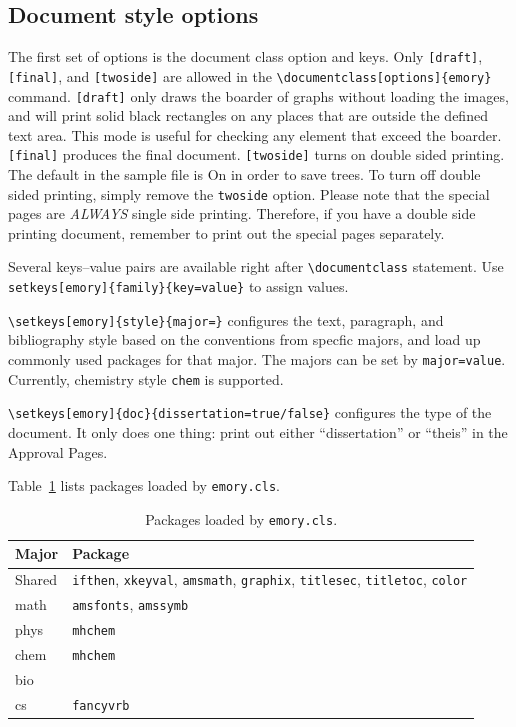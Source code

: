 \documentclass[draft]{emory}
\begin{document}
\subsection{Document style options}
The first set of options is the document class option and keys. Only \Verb|[draft]|,
\Verb|[final]|, and \Verb|[twoside]| are allowed in the \Verb|\documentclass[options]{emory}| 
command. \Verb|[draft]| only draws the boarder of graphs without loading the images,
and will print solid black rectangles on any places that are outside the defined
text area. This mode is useful for checking any element that exceed the boarder.
\Verb|[final]| produces the final document. \Verb|[twoside]| turns on double sided
printing. The default in the sample file is On in order to save trees. To turn
off double sided printing, simply remove the \Verb|twoside| option.
Please note that the special pages are \emph{ALWAYS} single side printing. 
Therefore, if you have a double side printing document, remember to print out
the special pages separately.

Several keys--value pairs are available right after \Verb|\documentclass| statement.
Use \Verb|setkeys[emory]{family}{key=value}| to assign values.

\Verb|\setkeys[emory]{style}{major=}| configures the text, paragraph, and 
bibliography style based on the conventions
from specfic majors, and load up commonly used packages for that major.
The majors can be set by \Verb|major=value|.
Currently, chemistry style \Verb|chem| is supported. 

\Verb|\setkeys[emory]{doc}{dissertation=true/false}| configures the type of the 
document. It only does one thing: print out either ``dissertation'' or ``theis''
in the Approval Pages.

Table~\ref{tbl:packages} lists packages loaded by \Verb|emory.cls|.
\begin{table}[htp!]
  \centering
  \caption{Packages loaded by \protect\Verb|emory.cls|. \label{tbl:packages}}
  \begin{tabular}{l l}
    \hline
    Major & Package \\
    \hline
    Shared & \protect\Verb|ifthen|, \protect\Verb|xkeyval|, \protect\Verb|amsmath|,
             \protect\Verb|graphix|, \protect\Verb|titlesec|, 
             \protect\Verb|titletoc|, \protect\Verb|color| \\
    math & \protect\Verb|amsfonts|, \protect\Verb|amssymb| \\
    phys & \protect\Verb|mhchem| \\
    chem & \protect\Verb|mhchem| \\
    bio & \\
    cs & \protect\Verb|fancyvrb| \\
    \hline
  \end{tabular}
\end{table}
\end{document}
